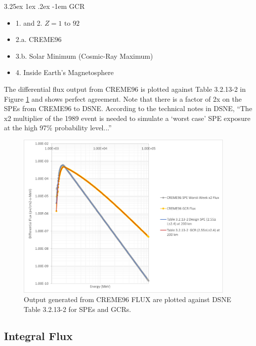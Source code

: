 \documentclass{hitec}
\makeatletter
\renewcommand\paragraph{\@startsection{paragraph}{5}{\z@}%
	{3.25ex \@plus1ex \@minus.2ex}%
	{-1em}%
	{\normalfont\normalsize\bfseries}}
\makeatother
\begin{document}
\paragraph{GCR}
\begin{itemize}
	\item 1. and 2. $Z = 1 \text{ to } 92$
	\item 2.a. CREME96
	\item 3.b. Solar Minimum (Cosmic-Ray Maximum)
	\item 4. Inside Earth's Magnetosphere
\end{itemize}

The differential flux output from CREME96 is plotted against Table 3.2.13-2 in Figure \ref{fig:DSNE_Differential_Flux_Comparison} and shows perfect agreement. Note that there is a factor of 2\textsf{x} on the SPEs from CREME96 to DSNE. According to the technical notes in DSNE, ``The x2 multiplier of the 1989 event is needed to simulate a `worst case' SPE exposure at the high 97\% probability level...''

\begin{figure}[htbp!]
	\centering
	\includegraphics[width=0.95\textwidth]{DSNE_Differential_Flux_Comparison.png}
	\caption{Output generated from CREME96 \textsf{FLUX} are plotted against DSNE Table 3.2.13-2 for SPEs and GCRs.}\label{fig:DSNE_Differential_Flux_Comparison}
\end{figure}

\clearpage %

\subsection{Integral Flux}
\end{document}
